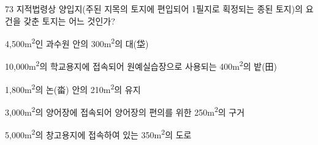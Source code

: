 \begin{question}{73}
지적법령상 양입지(주된 지목의 토지에 편입되어 1필지로 획정되는 종된 토지)의 요건을 갖춘 토지는 어느 것인가?
\begin{choices}
  \item 4,500m\textsuperscript{2}인 과수원 안의 300m\textsuperscript{2}의 대(垈)
  \item 10,000m\textsuperscript{2}의 학교용지에 접속되어 원예실습장으로 사용되는 400m\textsuperscript{2}의 밭(田)
  \item 1,800m\textsuperscript{2}의 논(畓) 안의 210m\textsuperscript{2}의 유지
  \item 3,000m\textsuperscript{2}의 양어장에 접속되어 양어장의 편의를 위한 250m\textsuperscript{2}의 구거
  \item 5,000m\textsuperscript{2}의 창고용지에 접속하여 있는 350m\textsuperscript{2}의 도로
\end{choices}
\end{question}
